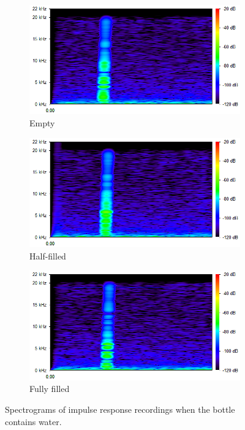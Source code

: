 \documentclass{article} %
\begin{document}
\begin{figure}[htb]
\centering
\begin{subfigure}{0.32\linewidth}
  \includegraphics[width=\linewidth]{water_empty.png}
  \caption*{Empty}
\end{subfigure}
\begin{subfigure}{0.32\linewidth}
  \includegraphics[width=\linewidth]{water_half.png}
  \caption*{Half-filled}
\end{subfigure}
\begin{subfigure}{0.32\linewidth}
  \includegraphics[width=\linewidth]{water_full.png}
  \caption*{Fully filled}
\end{subfigure}
  \caption{Spectrograms of impulse response recordings when the bottle contains water.}
  \label{fig:spectrograms}
\end{figure}
\end{document}
